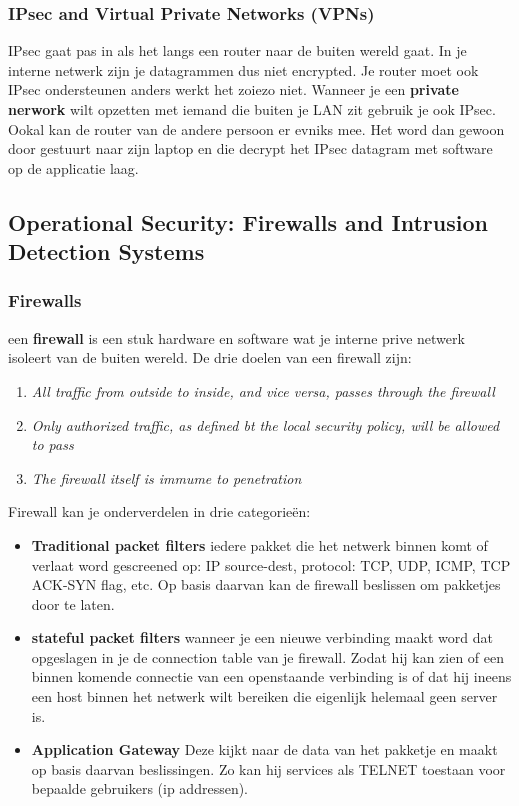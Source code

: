 \subsubsection{IPsec and Virtual Private Networks (VPNs)}
IPsec gaat pas in als het langs een router naar de buiten wereld gaat. In je interne netwerk zijn je datagrammen dus
niet encrypted. Je router moet ook IPsec ondersteunen anders werkt het zoiezo niet.
\newline
Wanneer je een \textbf{private nerwork} wilt opzetten met iemand die buiten je LAN zit gebruik je ook IPsec. Ookal
kan de router van de andere persoon er evniks mee. Het word dan gewoon door gestuurt naar zijn laptop en die decrypt
het IPsec datagram met software op de applicatie laag.

\addtocounter{subsection}{1}
\subsection{Operational Security: Firewalls and Intrusion Detection Systems}
\subsubsection{Firewalls}
een \textbf{firewall} is een stuk hardware en software wat je interne prive netwerk isoleert van de buiten wereld.
De drie doelen van een firewall zijn:
\begin{enumerate}
    \item \textit{All traffic from outside to inside, and vice versa, passes through the firewall}
    \item \textit{Only authorized traffic, as defined bt the local security policy, will be allowed to pass}
    \item \textit{The firewall itself is immume to penetration}
\end{enumerate}
Firewall kan je onderverdelen in drie categorieën:
\begin{itemize}
    \item \textbf{Traditional packet filters} iedere pakket die het netwerk binnen komt of verlaat word gescreened
    op: IP source-dest, protocol: TCP, UDP, ICMP, TCP ACK-SYN flag, etc. Op basis daarvan kan de firewall beslissen om
    pakketjes door te laten.
    \item \textbf{stateful packet filters} wanneer je een nieuwe verbinding maakt word dat opgeslagen in je de
    connection table van je firewall. Zodat hij kan zien of een binnen komende connectie van een openstaande
    verbinding is of dat hij ineens een host binnen het netwerk wilt bereiken die eigenlijk helemaal geen server is.
    \item \textbf{Application Gateway} Deze kijkt naar de data van het pakketje en maakt op basis daarvan
    beslissingen. Zo kan hij services als TELNET toestaan voor bepaalde gebruikers (ip addressen).
\end{itemize}

